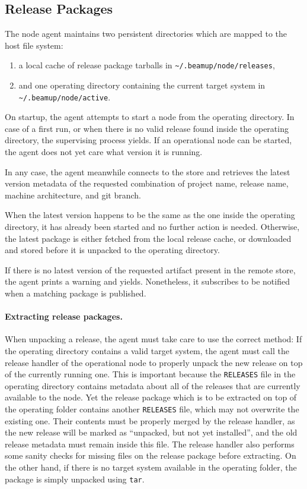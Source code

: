 \subsection{Release Packages}

The node agent maintains two persistent directories which are mapped to the host file system: \begin{enumerate}[label=(\roman*)]
  \item a local cache of release package tarballs in \lstinline[breaklines=true]|~/.beamup/node/releases|,
  \item and one operating directory containing the current target system in \lstinline[breaklines=true]|~/.beamup/node/active|.
\end{enumerate}

On startup, the agent attempts to start a node from the operating directory. In case of a first run, or when there is no valid release found inside the operating directory, the supervising process yields. If an operational node can be started, the agent does not yet care what version it is running.

In any case, the agent meanwhile connects to the store and retrieves the latest version metadata of the requested combination of project name, release name, machine architecture, and git branch.

When the latest version happens to be the same as the one inside the operating directory, it has already been started and no further action is needed. Otherwise, the latest package is either fetched from the local release cache, or downloaded and stored before it is unpacked to the operating directory.

If there is no latest version of the requested artifact present in the remote store, the agent prints a warning and yields. Nonetheless, it subscribes to be notified when a matching package is published.


\paragraph{Extracting release packages.}
When unpacking a release, the agent must take care to use the correct method: If the operating directory contains a valid target system, the agent must call the release handler of the operational node to properly unpack the new release on top of the currently running one. This is important because the \lstinline|RELEASES| file in the operating directory contains metadata about all of the releases that are currently available to the node. Yet the release package which is to be extracted on top of the operating folder contains another \lstinline|RELEASES| file, which may not overwrite the existing one. Their contents must be properly merged by the release handler, as the new release will be marked as ``unpacked, but not yet installed'', and the old release metadata must remain inside this file. The release handler also performs some sanity checks for missing files on the release package before extracting. On the other hand, if there is no target system available in the operating folder, the package is simply unpacked using \lstinline|tar|.


